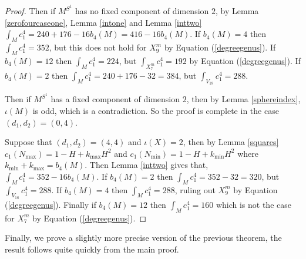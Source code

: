 \documentclass[12pt]{article}
\begin{document}
\begin{proof}
Then if $M^{S^1}$ has no fixed component of dimension $2$,  by Lemma \ref{zerofourcaseone}, Lemma \ref{intone} and Lemma \ref{inttwo} $\int_{M} c_{1}^4 = 240 + 176  - 16 b_{4}(M) = 416 - 16 b_{4}(M)$. If $b_{4}(M)= 4$ then $\int_{M} c_{1}^4 = 352$, but this does not hold for $X^{m}_{9}$  by Equation (\ref{degreegenus}). If  $b_{4}(M)= 12$ then $\int_{M} c_{1}^4 = 224$, but $\int_{X^{m}_{7}} c_{1}^4= 192$  by Equation (\ref{degreegenus}). If $b_{4}(M)=2$ then $\int_{M} c_{1}^4 = 240 + 176  - 32 = 384$, but  $\int_{V_{18}} c_{1}^4= 288$.

Then if $M^{S^1}$ has a fixed component of dimension $2$, then by  Lemma \ref{sphereindex}, $\iota(M)$ is odd, which is a contradiction. So the proof is complete in the case $(d_1,d_2) = (0,4)$.

Suppose that $(d_1,d_2)=(4,4)$ and $\iota(X)=2$, then by Lemma \ref{squares} $c_{1}(N_{\max}) = 1 -H + k_{\max}H^2$ and  $c_{1}(N_{\min}) = 1 -H + k_{\min}H^2$ where $k_{\min}+ k_{\max}=b_{4}(M)$. Then  Lemma \ref{inttwo} gives that, $\int_{M} c_{1}^4 = 352  - 16 b_{4}(M)$.  If $b_{4}(M)=2$ then $\int_{M} c_{1}^4 = 352  - 32 = 320$, but  $\int_{V_{18}} c_{1}^4= 288$. If $b_{4}(M)= 4$ then $\int_{M} c_{1}^4 = 288$,  ruling out $X^{m}_{9}$ by Equation (\ref{degreegenus}). 
Finally if $b_{4}(M)=12$ then  $\int_{M} c_{1}^4 = 160$ which is not the case for $X^{m}_{7}$  by Equation (\ref{degreegenus}).
\end{proof}
Finally, we prove a slightly more precise version of the previous theorem, the result follows quite quickly from the main proof.
\end{document}
